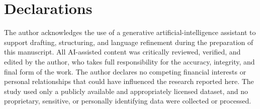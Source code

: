 \section*{Declarations}
The author acknowledges the use of a generative artificial-intelligence assistant to support drafting, structuring, and language refinement during the preparation of this manuscript.
All AI-assisted content was critically reviewed, verified, and edited by the author, who takes full responsibility for the accuracy, integrity, and final form of the work.
The author declares no competing financial interests or personal relationships that could have influenced the research reported here.
The study used only a publicly available and appropriately licensed dataset, and no proprietary, sensitive, or personally identifying data were collected or processed.
